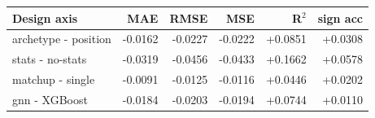 \begin{table}[t]
\label{tab:ablation-summary}
\centering
\begin{tabular}{lrrrrr}
\toprule
Design axis & MAE & RMSE & MSE & R$^2$ & sign acc \\
\midrule
archetype - position & -0.0162 & -0.0227 & -0.0222 & +0.0851 & +0.0308 \\
stats - no-stats & -0.0319 & -0.0456 & -0.0433 & +0.1662 & +0.0578 \\
matchup - single & -0.0091 & -0.0125 & -0.0116 & +0.0446 & +0.0202 \\
gnn - XGBoost & -0.0184 & -0.0203 & -0.0194 & +0.0744 & +0.0110 \\
\bottomrule
\end{tabular}
\end{table}
